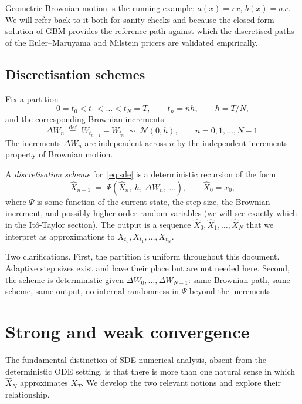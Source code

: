\documentclass[11pt,a4paper]{article}
\theoremstyle{plain}
\theoremstyle{definition}
\theoremstyle{remark}
\newcommand{\eqdef}{\overset{\mathrm{def}}{=}}
\begin{document}
Geometric Brownian motion is the running example: $a(x) = r x$,
$b(x) = \sigma x$. We will refer back to it both for sanity checks and
because the closed-form solution of GBM provides the reference path
against which the discretised paths of the Euler--Maruyama and Milstein
pricers are validated empirically.

\subsection{Discretisation schemes}

Fix a partition
\begin{equation}
0 = t_0 < t_1 < \dots < t_N = T,
\qquad t_n = n h,
\qquad h = T / N,
\end{equation}
and the corresponding Brownian increments
\begin{equation}
\Delta W_n \;\eqdef\; W_{t_{n+1}} - W_{t_n}
\;\sim\; \mathcal{N}(0, h),
\qquad n = 0, 1, \dots, N-1.
\end{equation}
The increments $\Delta W_n$ are independent across $n$ by the
independent-increments property of Brownian motion.

A \emph{discretisation scheme} for~\eqref{eq:sde} is a deterministic
recursion of the form
\begin{equation}
\label{eq:scheme-abstract}
\hat X_{n+1} \;=\; \Psi\!\left(
\hat X_n,\ h,\ \Delta W_n,\ \dots
\right),
\qquad \hat X_0 = x_0,
\end{equation}
where $\Psi$ is some function of the current state, the step size, the
Brownian increment, and possibly higher-order random variables (we
will see exactly which in the It\^o-Taylor section). The output is a
sequence $\hat X_0, \hat X_1, \dots, \hat X_N$ that we interpret as
approximations to $X_{t_0}, X_{t_1}, \dots, X_{t_N}$.

Two clarifications. First, the partition is uniform throughout this
document. Adaptive step sizes exist and have their place but are not
needed here. Second, the scheme is deterministic given
$\Delta W_0, \dots, \Delta W_{N-1}$: same Brownian path, same scheme,
same output, no internal randomness in $\Psi$ beyond the increments.

\section{Strong and weak convergence}
\label{sec:convergence}

The fundamental distinction of SDE numerical analysis, absent from
the deterministic ODE setting, is that there is more than one natural
sense in which $\hat X_N$ approximates $X_T$. We develop the two
relevant notions and explore their relationship.
\end{document}

